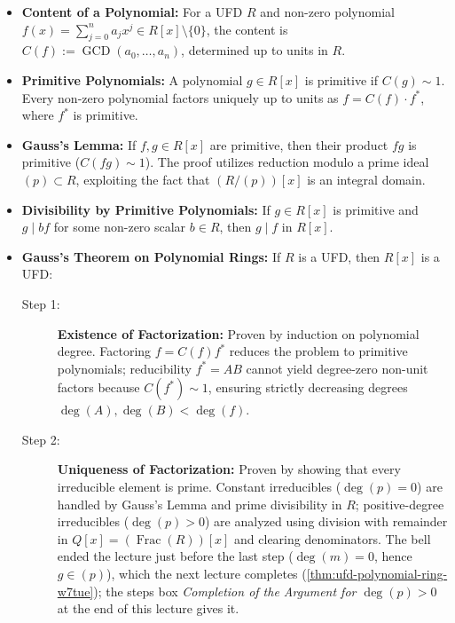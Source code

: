 \begin{overview}
\begin{itemize}
    \item \textbf{Content of a Polynomial:} For a UFD $R$ and non-zero polynomial $f(x) = \sum_{j=0}^n a_j x^j \in R[x] \setminus \{0\}$, the content is $C(f) := \operatorname{GCD}(a_0, \dots, a_n)$, determined up to units in $R$.
    \item \textbf{Primitive Polynomials:} A polynomial $g \in R[x]$ is primitive if $C(g) \sim 1$. Every non-zero polynomial factors uniquely up to units as $f = C(f) \cdot f^*$, where $f^*$ is primitive.
    \item \textbf{Gauss's Lemma:} If $f, g \in R[x]$ are primitive, then their product $fg$ is primitive ($C(fg) \sim 1$). The proof utilizes reduction modulo a prime ideal $(p) \subset R$, exploiting the fact that $(R/(p))[x]$ is an integral domain.
    \item \textbf{Divisibility by Primitive Polynomials:} If $g \in R[x]$ is primitive and $g \mid bf$ for some non-zero scalar $b \in R$, then $g \mid f$ in $R[x]$.
    \item \textbf{Gauss's Theorem on Polynomial Rings:} If $R$ is a UFD, then $R[x]$ is a UFD:
    \begin{description}
        \item[Step 1:] \textbf{Existence of Factorization:} Proven by induction on polynomial degree. Factoring $f = C(f) f^*$ reduces the problem to primitive polynomials; reducibility $f^* = AB$ cannot yield degree-zero non-unit factors because $C(f^*) \sim 1$, ensuring strictly decreasing degrees $\deg(A), \deg(B) < \deg(f)$.
        \item[Step 2:] \textbf{Uniqueness of Factorization:} Proven by showing that every irreducible element is prime. Constant irreducibles ($\deg(p) = 0$) are handled by Gauss's Lemma and prime divisibility in $R$; positive-degree irreducibles ($\deg(p) > 0$) are analyzed using division with remainder in $Q[x] = (\operatorname{Frac}(R))[x]$ and clearing denominators. The bell ended the lecture just before the last step ($\deg(m) = 0$, hence $g \in (p)$), which the next lecture completes (\cref{thm:ufd-polynomial-ring-w7tue}); the steps box \emph{Completion of the Argument for $\deg(p) > 0$} at the end of this lecture gives it.
    \end{description}
\end{itemize}
\end{overview}